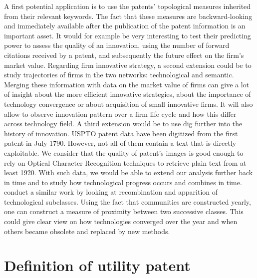 \documentclass[article]{article}%
\begin{document}
A first potential application is to use the patents' topological measures inherited from their relevant keywords. The fact that these measures are backward-looking and immediately available after the publication of the patent information is an important asset. It would for example be very interesting to test their predicting power to assess the quality of an innovation, using the number of forward citations received by a patent, and subsequently the future effect on the firm's market value. Regarding firm innovative strategy, a second extension could be to study trajectories of firms in the two networks: technological and semantic. Merging these information with data on the market value of firms can give a lot of insight about the more efficient innovative strategies, about the importance of technology convergence or about acquisition of small innovative firms. It will also allow to observe innovation pattern over a firm life cycle and how this differ across technology field. A third extension would be to use dig further into the history of innovation. USPTO patent data have been digitized from the first patent in July 1790. However, not all of them contain a text that is directly exploitable. We consider that the quality of patent's images is good enough to rely on Optical Character Recognition techniques to retrieve plain text from at least 1920. With such data, we would be able to extend our analysis further back in time and to study how technological progress occurs and combines in time. \cite{akcigit2013mechanics} conduct a similar work by looking at recombination and apparition of technological subclasses.
Using the fact that communities are constructed yearly, one can construct a measure of proximity between two successive classes. This could give clear view on how technologies converged over the year and when others became obsolete and replaced by new methods.


\newpage
\appendix

\section{Definition of utility patent}  \label{app:utility}
\end{document}

